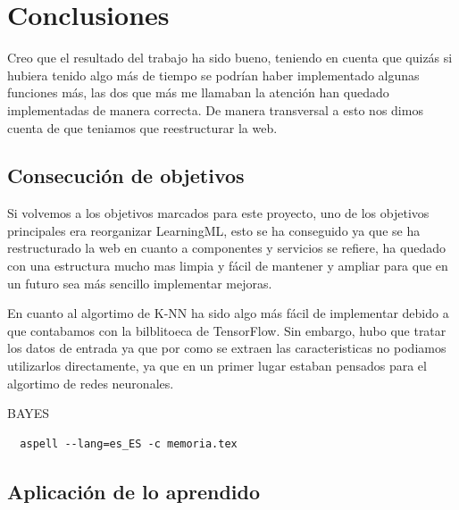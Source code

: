 \documentclass[a4paper, 12pt]{book}
\begin{document}




\cleardoublepage
\chapter{Conclusiones}
\label{chap:conclusiones}

Creo que el resultado del trabajo ha sido bueno, teniendo en cuenta que quizás si hubiera tenido algo más de tiempo se podrían haber implementado algunas funciones más, las dos que más me llamaban la atención han quedado implementadas de manera correcta. De manera transversal a esto nos dimos cuenta de que teniamos que reestructurar la web.

\section{Consecución de objetivos}
\label{sec:consecucion-objetivos}

Si volvemos a los objetivos marcados para este proyecto, uno de los objetivos principales era reorganizar LearningML, esto se ha conseguido ya que se ha restructurado la web en cuanto a componentes y servicios se refiere, ha quedado con una estructura mucho mas limpia y fácil de mantener y ampliar para que en un futuro sea más sencillo implementar mejoras.

En cuanto al algortimo de K-NN ha sido algo más fácil de implementar debido a que contabamos con la bilblitoeca de TensorFlow. Sin embargo, hubo que tratar los datos de entrada ya que por como se extraen las caracteristicas no podiamos utilizarlos directamente, ya que en un primer lugar estaban pensados para el algortimo de redes neuronales.

BAYES




\begin{verbatim}
  aspell --lang=es_ES -c memoria.tex
\end{verbatim}

\section{Aplicación de lo aprendido}
\label{sec:aplicacion}
\end{document}
